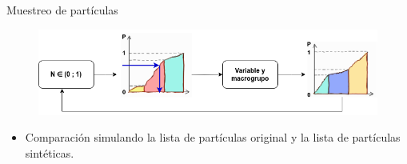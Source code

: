 \documentclass[aspectratio=169,english]{beamer}
\begin{document}
\begin{frame}{Muestreo de partículas}
    \begin{figure}
        \centering
        \includegraphics[width=1\linewidth]{imagens/esquema5.png}
        \label{fig:esquema5}
    \end{figure}

    \begin{itemize}
        \item Comparación simulando la lista de partículas original y la lista de partículas sintéticas.
    \end{itemize}

\end{frame}
\end{document}
